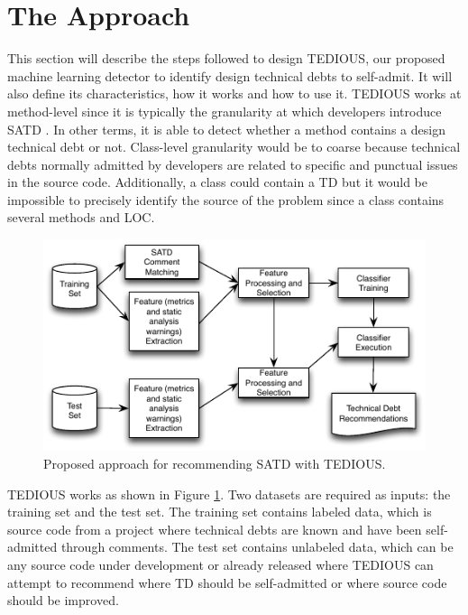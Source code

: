 \label{sec:Theme1}


\section{The Approach}


This section will describe the steps followed to design \ac{TEDIOUS}, our proposed machine learning detector to identify design technical debts to self-admit. It will also define its characteristics, how it works and how to use it. \ac{TEDIOUS} works at method-level since it is typically the granularity at which developers introduce \ac{SATD} \citep{MaldonadoS15,PotdarS14}. In other terms, it is able to detect whether a method contains a design technical debt or not. Class-level granularity would be to coarse because technical debts normally admitted by developers are related to specific and punctual issues in the source code. Additionally, a class could contain a \ac{TD} but it would be impossible to precisely identify the source of the problem since a class contains several methods and \ac{LOC}. \par 

\begin{figure}[t]
	\centering
	\includegraphics[width=\linewidth]{figs/approach.pdf}
	\caption{Proposed approach for recommending SATD with TEDIOUS.}
	\label{fig:approach}
	\vspace{-4mm}
\end{figure}

\ac{TEDIOUS} works as shown in Figure \ref{fig:approach}. Two datasets are required as inputs: the training set and the test set. The training set contains labeled data, which is source code from a project where technical debts are known and have been self-admitted through comments. The test set contains unlabeled data, which can be any source code under development or already released where \ac{TEDIOUS} can attempt to recommend where \ac{TD} should be self-admitted or where source code should be improved. \par 
	
